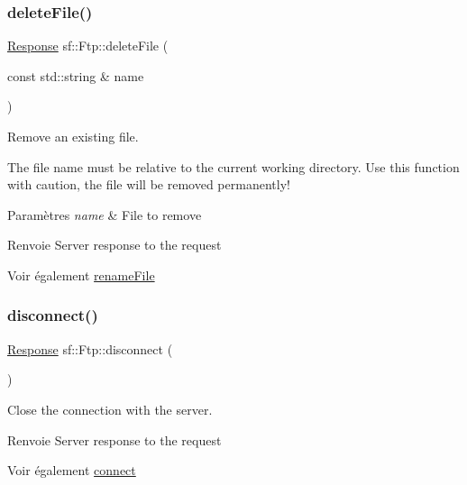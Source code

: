 \subsubsection{\texorpdfstring{delete\+File()}{deleteFile()}}
{\footnotesize\ttfamily \hyperlink{classsf_1_1Ftp_1_1Response}{Response} sf\+::\+Ftp\+::delete\+File (\begin{DoxyParamCaption}\item[{const std\+::string \&}]{name }\end{DoxyParamCaption})}



Remove an existing file. 

The file name must be relative to the current working directory. Use this function with caution, the file will be removed permanently!


\begin{DoxyParams}{Paramètres}
{\em name} & File to remove\\
\hline
\end{DoxyParams}
\begin{DoxyReturn}{Renvoie}
Server response to the request
\end{DoxyReturn}
\begin{DoxySeeAlso}{Voir également}
\hyperlink{classsf_1_1Ftp_a8f99251d7153e1dc26723e4006deb764}{rename\+File} 
\end{DoxySeeAlso}
\mbox{\label{classsf_1_1Ftp_acf7459926f3391cd06bf84337ed6a0f4}} 
\subsubsection{\texorpdfstring{disconnect()}{disconnect()}}
{\footnotesize\ttfamily \hyperlink{classsf_1_1Ftp_1_1Response}{Response} sf\+::\+Ftp\+::disconnect (\begin{DoxyParamCaption}{ }\end{DoxyParamCaption})}



Close the connection with the server. 

\begin{DoxyReturn}{Renvoie}
Server response to the request
\end{DoxyReturn}
\begin{DoxySeeAlso}{Voir également}
\hyperlink{classsf_1_1Ftp_af02fb3de3f450a50a27981961c69c860}{connect} 
\end{DoxySeeAlso}
\mbox{\label{classsf_1_1Ftp_a20c1600ec5fd6f5a2ad1429ab8aa5df4}} 
